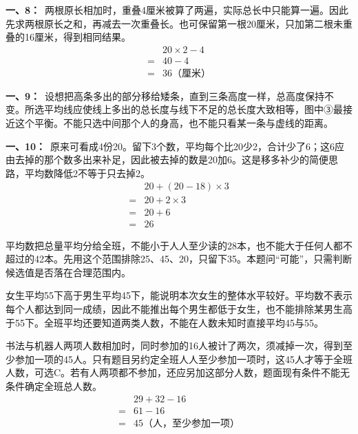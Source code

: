 \documentclass[multi=snippet,border=0pt]{standalone}
\newenvironment{snippet}[3]{\begin{minipage}{#1bp}\color{answerred}\fontsize{#2}{#3}\selectfont\raggedright}{\end{minipage}}
\begin{document}
\begin{snippet}{505}{11.5}{14}\textbf{一、8：}\ 两根原长相加时，重叠4厘米被算了两遍，实际总长中只能算一遍。因此先求两根原长之和，再减去一次重叠长。也可保留第一根20厘米，只加第二根未重叠的16厘米，得到相同结果。\[\begin{aligned}&20\times2-4\\={}&40-4\\={}&36\text{（厘米）}\end{aligned}\]\end{snippet}
\begin{snippet}{505}{11.5}{14}\textbf{一、9：}\ 设想把高条多出的部分移给矮条，直到三条高度一样，总高度保持不变。所选平均线应使线上多出的总长度与线下不足的总长度大致相等，图中③最接近这个平衡。不能只选中间那个人的身高，也不能只看某一条与虚线的距离。\end{snippet}
\begin{snippet}{505}{11.5}{14}\textbf{一、10：}\ 原来可看成4份20。留下3个数，平均每个比20少2，合计少了6；这6应由去掉的那个数多出来补足，因此被去掉的数是20加6。这是移多补少的简便思路，平均数降低2不等于只去掉2。\[\begin{aligned}&20+(20-18)\times3\\={}&20+2\times3\\={}&20+6\\={}&26\end{aligned}\]\end{snippet}
\begin{snippet}{505}{11.5}{14}平均数把总量平均分给全班，不能小于人人至少读的28本，也不能大于任何人都不超过的42本。先用这个范围排除25、45、20，只留下35。本题问“可能”，只需判断候选值是否落在合理范围内。\end{snippet}
\begin{snippet}{505}{11.5}{14}女生平均55下高于男生平均45下，能说明本次女生的整体水平较好。平均数不表示每个人都达到同一成绩，因此不能推出每个男生都低于女生，也不能排除某男生高于55下。全班平均还要知道两类人数，不能在人数未知时直接平均45与55。\end{snippet}
\begin{snippet}{505}{11.5}{14}书法与机器人两项人数相加时，同时参加的16人被计了两次，须减掉一次，得到至少参加一项的45人。只有题目另约定全班人人至少参加一项时，这45人才等于全班人数，可选C。若有人两项都不参加，还应另加这部分人数，题面现有条件不能无条件确定全班总人数。\[\begin{aligned}&29+32-16\\={}&61-16\\={}&45\text{（人，至少参加一项）}\end{aligned}\]\end{snippet}
\end{document}

